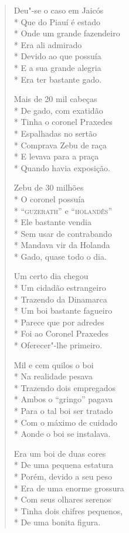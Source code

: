 \begin{verse}
Deu"-se o caso em Jaicós\\*
Que do Piauí é estado\\*
Onde um grande fazendeiro\\*
Era ali admirado\\*
Devido ao que possuía\\*
E a sua grande alegria\\*
Era ter bastante gado.

Mais de 20 mil cabeças\\*
De gado, com exatidão\\*
Tinha o coronel Praxedes\\*
Espalhadas no sertão\\*
Comprava Zebu de raça\\*
E levava para a praça\\*
Quando havia exposição.

Zebu de 30 milhões\\*
O coronel possuía\\*
``\textsc{guzerath}'' e ``\textsc{holandês}''\\*
Ele bastante vendia\\*
Sem usar de contrabando\\*
Mandava vir da Holanda\\*
Gado, quase todo o dia.

Um certo dia chegou\\*
Um cidadão estrangeiro\\*
Trazendo da Dinamarca\\*
Um boi bastante fagueiro\\*
Parece que por adredes\\*
Foi ao Coronel Praxedes\\*
Oferecer"-lhe primeiro.

Mil e cem quilos o boi\\*
Na realidade pesava\\*
Trazendo dois empregados\\*
Ambos o ``gringo'' pagava\\*
Para o tal boi ser tratado\\*
Com o máximo de cuidado\\*
Aonde o boi se instalava.

Era um boi de duas cores\\*
De uma pequena estatura\\*
Porém, devido a seu peso\\*
Era de uma enorme grossura\\*
Com seus olhares serenos\\*
Tinha dois chifres pequenos,\\*
De uma bonita figura.


\end{verse}
